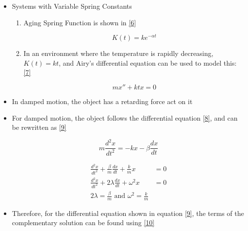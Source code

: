 \documentclass[12pt]{article}
\begin{document}
\begin{itemize}
\begin{enumerate}
\begin{enumerate}
    \end{enumerate}

\end{enumerate}

\item Systems with Variable Spring Constants

  \begin{enumerate}

    \item Aging Spring Function is shown in \eqref{6}

      \begin{equation}
        K(t)=ke^{-\alpha t}
        \label{6}
      \end{equation}

    \item In an environment where the temperature is rapidly decreasing, $K(t)=kt$, and Airy's differential equation can be used to model this: \eqref{7}

      \begin{equation}
        mx''+ktx=0
        \label{7}
      \end{equation}

  \end{enumerate}

\item In damped motion, the object has a retarding force act on it

\item For damped motion, the object follows the differential equation \eqref{8}, and can be rewritten as \eqref{9}

  \begin{equation}
    m\frac{d^2x}{dt^2}=-kx-\beta\frac{dx}{dt}
    \label{8}
  \end{equation}

  \begin{equation}
    \begin{split}
      \frac{d^2x}{dt^2}+\frac{\beta}{m}\frac{dx}{dt}+\frac{k}{m}x&=0\\
      \frac{d^2x}{dt^2}+2\lambda\frac{dx}{dt}+\omega^2x&=0\\
      2\lambda=\frac{\beta}{m} \text{ and } \omega^2=\frac{k}{m}
    \end{split}
    \label{9}
  \end{equation}

\item Therefore, for the differential equation shown in equation \eqref{9}, the terms of the complementary solution can be found using \eqref{10}


\end{itemize}
\end{document}
